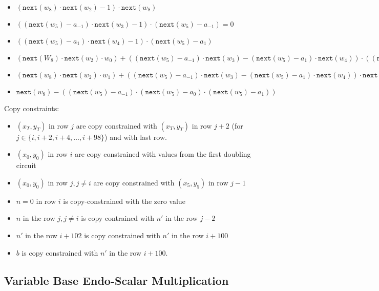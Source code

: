 \begin{itemize}
    \item $(\texttt{next}(w_8) \cdot \texttt{next}(w_2) - 1) \cdot \texttt{next}(w_8)$
    \item $((\texttt{next}(w_5) - a_{-1}) \cdot \texttt{next}(w_3) - 1) \cdot (\texttt{next}(w_5) - a_{-1}) = 0$
    \item $((\texttt{next}(w_5) - a_1) \cdot \texttt{next}(w_4) - 1) \cdot (\texttt{next}(w_5) - a_1)$
	\item $(\texttt{next}(W_8) \cdot \texttt{next}(w_2) \cdot w_0) + ((\texttt{next}(w_5) - a_{-1}) \cdot \texttt{next}(w_3) - (\texttt{next}(w_5) - a_1) \cdot \texttt{next}(w_4)) \cdot ((\texttt{next}(w_5) - a_{-1}) \cdot \texttt{next}(w_3) - (\texttt{next}(w_5) - a_1) \cdot \texttt{next}(w_4)) \cdot \texttt{next}(w_6) - \texttt{next}(w_0) = 0$
    \item $(\texttt{next}(w_8)\cdot \texttt{next}(w_2) \cdot w_1) +((\texttt{next}(w_5) - a_{-1}) \cdot \texttt{next}(w_3) - (\texttt{next}(w_5) - a_1) \cdot \texttt{next}(w_4)) \cdot \texttt{next}(w_7) - \texttt{next}(w_1) = 0$
    \item $\texttt{next}(w_8) - ((\texttt{next}(w_5) - a_{-1}) \cdot (\texttt{next}(w_5) - a_0) \cdot (\texttt{next}(w_5) - a_1))$ 
\end{itemize}    
    Copy constraints:
    \begin{itemize}
    \item $(x_T,y_T)$ in row $j$ are copy constrained with $(x_T,y_T)$ in row $j + 2$ (for $j \in \{i, i + 2, i + 4, \dots, i + 98\}$) and with last row.
    \item $(x_0,y_0)$ in row $i$ are copy constrained with values from the first doubling circuit
    \item $(x_0,y_0)$ in row $j, j \neq i$ are copy constrained with $(x_5,y_5)$ in row $j - 1$ 
    \item $n = 0$ in row $i$ is copy-constrained with the zero value
    \item $n$ in the row $j, j \neq i$ is copy contrained with $n'$ in the row $j-2$
    \item $n'$ in the row $i + 102$ is copy constrained with $n'$ in the row $i + 100$
    \item $b$ is copy constrained with $n'$ in the row $i + 100$.
\end{itemize}

\subsection{Variable Base Endo-Scalar Multiplication}

